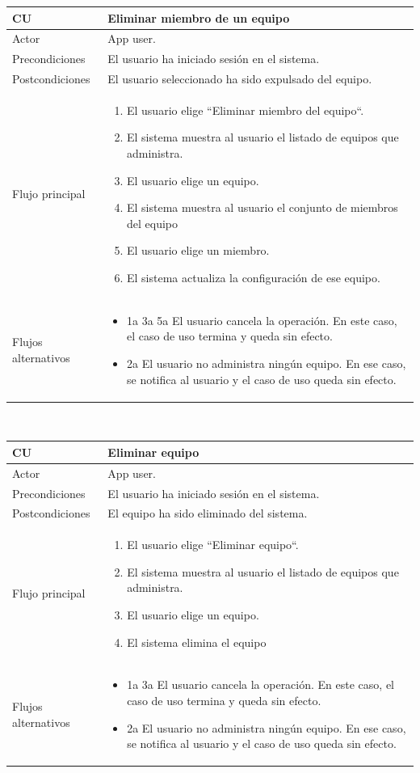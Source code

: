 \documentclass[twoside]{report}
\newcommand\addrow[2]{#1 &#2\\ }
\newcommand\addheading[2]{#1 &#2\\ \hline}
\newcommand\tabularhead{\begin{tabular}{lp{0.7\textwidth}}
\hline
}
\newenvironment{usecase}{\tabularhead}
{\hline\end{tabular}}
\begin{document}
\begin{usecase}
  \addheading{\textbf{CU\arabic{usecase}}}{Eliminar miembro de un equipo} 
  \addrow{Actor}{App user.}
  \addrow{Precondiciones}{El usuario ha iniciado sesión en el sistema.}
  \addrow{Postcondiciones}{El usuario seleccionado ha sido expulsado del equipo.}
  \addrow{Flujo principal}{
  		\begin{enumerate}
  		\item El usuario elige “Eliminar miembro del equipo“. %
  		\item El sistema muestra al usuario el listado de equipos que administra. %
  		\item El usuario elige un equipo. %
  		\item El sistema muestra al usuario el conjunto de miembros del equipo %
  		\item El usuario elige un miembro. %
  		\item El sistema actualiza la configuración de ese equipo. %
  		\end{enumerate}
  }
  \addrow{Flujos alternativos}{
  		\begin{itemize}
  		\item 1a 3a 5a El usuario cancela la operación. En este caso, el caso de uso termina y queda sin efecto.
  		\item 2a El usuario no administra ningún equipo. En ese caso, se notifica al usuario y el caso de uso queda sin efecto.
  		\end{itemize}
  }
\end{usecase}\\

\vspace{0.5cm}

\begin{usecase}
  \addheading{\textbf{CU\arabic{usecase}}}{Eliminar equipo} 
  \addrow{Actor}{App user.}
  \addrow{Precondiciones}{El usuario ha iniciado sesión en el sistema.}
  \addrow{Postcondiciones}{El equipo ha sido eliminado del sistema.}
  \addrow{Flujo principal}{
  		\begin{enumerate}
  		\item El usuario elige “Eliminar equipo“. %
  		\item El sistema muestra al usuario el listado de equipos que administra. %
  		\item El usuario elige un equipo. %
  		\item El sistema elimina el equipo %
  		\end{enumerate}
  }
  \addrow{Flujos alternativos}{
  		\begin{itemize}
  		\item 1a 3a El usuario cancela la operación. En este caso, el caso de uso termina y queda sin efecto.
  		\item 2a El usuario no administra ningún equipo. En ese caso, se notifica al usuario y el caso de uso queda sin efecto.
  		\end{itemize}
  }
\end{usecase}\\
\end{document}
